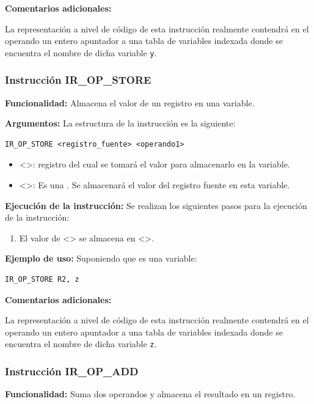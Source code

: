 \noindent
\textbf{Comentarios adicionales:}

La representación a nivel de código de esta instrucción realmente contendrá en el operando un entero apuntador a una tabla de variables indexada donde se encuentra el nombre de dicha variable \texttt{y}.

\newpage
\subsubsection{Instrucción IR\_OP\_STORE}\label{subsubsec:IR_OP_STORE}
\noindent
\textbf{Funcionalidad:} Almacena el valor de un registro en una variable.

\noindent
\textbf{Argumentos:} La estructura de la instrucción es la siguiente:

\begin{verbatim}
IR_OP_STORE <registro_fuente> <operando1>
\end{verbatim}
\begin{itemize}
    \item <>: registro del cual se tomará el valor para almacenarlo en la variable.
    \item <>: Es una . Se almacenará el valor del registro fuente en esta variable.
\end{itemize}

\noindent
\textbf{Ejecución de la instrucción:}
\noindent
Se realizan los siguientes pasos para la ejecución de la instrucción:

\begin{enumerate}
    \item El valor de <> se almacena en <>.
\end{enumerate}

\noindent
\textbf{Ejemplo de uso:}
\noindent
Suponiendo que  es una variable:

\begin{verbatim}
IR_OP_STORE R2, z
\end{verbatim}

\noindent
\textbf{Comentarios adicionales:}

La representación a nivel de código de esta instrucción realmente contendrá en el operando un entero apuntador a una tabla de variables indexada donde se encuentra el nombre de dicha variable \texttt{z}.

\subsubsection{Instrucción IR\_OP\_ADD}\label{subsubsec:IR_OP_ADD}
\noindent
\textbf{Funcionalidad:} Suma dos operandos y almacena el resultado en un registro.

